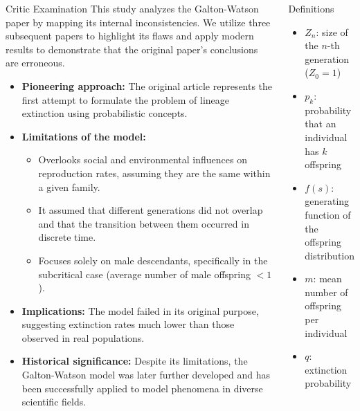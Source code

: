 \documentclass[palette=none,mode=dark]{impaTeXPoster}
\begin{document}
\begin{columns}
\begin{postercard}{Critic Examination}
This study analyzes the Galton-Watson paper by mapping its internal inconsistencies. We utilize three subsequent papers to highlight its flaws and apply modern results to demonstrate that the original paper's conclusions are erroneous.
    \begin{itemize}
        \item \textbf{Pioneering approach:} The original article represents the first attempt to formulate the problem of lineage extinction using probabilistic concepts.
        \item \textbf{Limitations of the model:}
        \begin{itemize}
            \item Overlooks social and environmental influences on reproduction rates, assuming they are the same within a given family.
            \item It assumed that different generations did not overlap and that the transition between them occurred in discrete time.
            \item Focuses solely on male descendants, specifically in the subcritical case (average number of male offspring $<1$).
        \end{itemize}
        \item \textbf{Implications:} The model failed in its original purpose, suggesting extinction rates much lower than those observed in real populations.
        \item \textbf{Historical significance:} Despite its limitations, the Galton-Watson model was later further developed and has been successfully applied to model phenomena in diverse scientific fields.
    \end{itemize}
\end{postercard}

\begin{postercard}{Definitions}
    
    \begin{itemize}
        \item \(Z_n\): size of the \(n\)-th generation (\(Z_0 = 1\))
        \item \(p_k\): probability that an individual has \(k\) offspring
        \item \(f(s)\): generating function of the offspring distribution
        \item \(m\): mean number of offspring per individual
        \item \(q\): extinction probability
    \end{itemize}


\end{postercard}
\end{columns}
\end{document}
